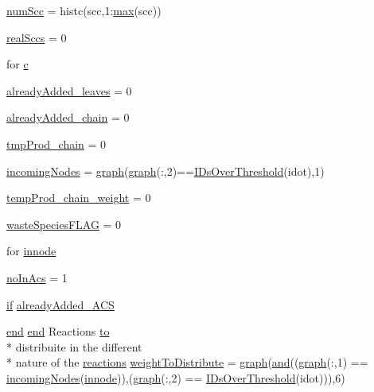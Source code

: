\begin{DoxyCompactItemize}
\item 
\hyperlink{a00028_a0d0db21d4520f7561ff56e2c80e4fb69}{num\-Scc} = histc(scc,1\-:\hyperlink{a00062_a6d9c24e62aee61f54530163edf684ae2}{max}(scc))
\item 
\hyperlink{a00028_a135a83e607075aa815c72f1ec0cbbc5a}{real\-Sccs} = 0
\item 
for \hyperlink{a00028_a0f16b7d4c8c225e06e6a8b2081508e64}{c}
\item 
\hyperlink{a00028_aabbdc56dad7f3314f69a712de710352c}{already\-Added\-\_\-leaves} = 0
\item 
\hyperlink{a00028_a1ddec545d7ccb86836f79e7f7e9ecb55}{already\-Added\-\_\-chain} = 0
\item 
\hyperlink{a00028_a80829d80ab721e79924274808616e45a}{tmp\-Prod\-\_\-chain} = 0
\item 
\hyperlink{a00028_a34c98e3306059653f2a214e5ef975e9c}{incoming\-Nodes} = \hyperlink{a00028_a2745e24fec2a44d51f4452beb1596bd3}{graph}(\hyperlink{a00028_a2745e24fec2a44d51f4452beb1596bd3}{graph}(\-:,2)==\hyperlink{a00028_a67c695f856b6731644c6a128e602a323}{I\-Ds\-Over\-Threshold}(idot),1)
\item 
\hyperlink{a00028_ab9ed4e2836783080230592e6bd20ef86}{temp\-Prod\-\_\-chain\-\_\-weight} = 0
\item 
\hyperlink{a00028_a86a34d23ef767cc82038231f868cea96}{waste\-Species\-F\-L\-A\-G} = 0
\item 
for \hyperlink{a00028_a21f06040cb68a910280e04d4c59d980e}{innode}
\item 
\hyperlink{a00028_ac45b9c97670e4b4e103ce174dc2db6b3}{no\-In\-Acs} = 1
\item 
\hyperlink{a00030_a01d55766b8058903dd360b4bda71f9f5}{if} \hyperlink{a00028_a77c2cda04a3103708011753a77dceda3}{already\-Added\-\_\-\-A\-C\-S}
\item 
\hyperlink{a00025_afb358f48b1646c750fb9da6c6585be2b}{end} \hyperlink{a00025_afb358f48b1646c750fb9da6c6585be2b}{end} Reactions \hyperlink{a00028_af71dbe52628a3f83a77ab494817525c6}{to} \\*
distribuite in the different \\*
nature of the \hyperlink{a00021}{reactions} \hyperlink{a00028_a8f29aae1a516e7b27fa97f490490b59c}{weight\-To\-Distribute} = \hyperlink{a00028_a2745e24fec2a44d51f4452beb1596bd3}{graph}(\hyperlink{a00028_a170f8acb213f91bf71c77b1d20bceb33}{and}((\hyperlink{a00028_a2745e24fec2a44d51f4452beb1596bd3}{graph}(\-:,1) == \hyperlink{a00028_a34c98e3306059653f2a214e5ef975e9c}{incoming\-Nodes}(\hyperlink{a00028_a21f06040cb68a910280e04d4c59d980e}{innode})),(\hyperlink{a00028_a2745e24fec2a44d51f4452beb1596bd3}{graph}(\-:,2) == \hyperlink{a00028_a67c695f856b6731644c6a128e602a323}{I\-Ds\-Over\-Threshold}(idot))),6)

\end{DoxyCompactItemize}
